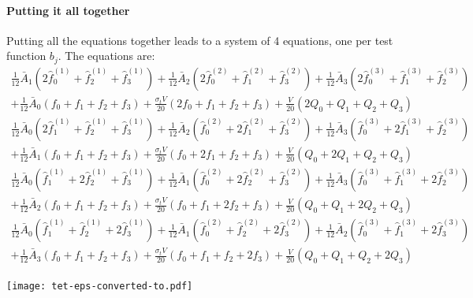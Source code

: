 \documentclass[12pt,letterpaper]{article}
\begin{document}
\paragraph{Putting it all together}
Putting all the equations together leads to a system of 4 equations, one per test function $b_j$.
The equations are:
\begin{align*}
\frac{1}{12} \bar{A}_1 \left( 2\hat{f}^{(1)}_0 + \hat{f}^{(1)}_2 + \hat{f}^{(1)}_3 \right)
+ \frac{1}{12} \bar{A}_2 \left( 2\hat{f}^{(2)}_0 + \hat{f}^{(2)}_1 + \hat{f}^{(2)}_3 \right)
+ \frac{1}{12} \bar{A}_3 \left( 2\hat{f}^{(3)}_0 + \hat{f}^{(3)}_1 + \hat{f}^{(3)}_2 \right) \\
+ \frac{1}{12} \bar{A}_0 \left( f_0 + f_1 + f_2 + f_3 \right)
+ \frac{\sigma_t V}{20} \left( 2f_0 + f_1 + f_2 + f_3 \right)
+ \frac{V}{20} \left( 2Q_0 + Q_1 + Q_2 + Q_3 \right)
\end{align*}
\begin{align*}
\frac{1}{12} \bar{A}_0 \left( 2\hat{f}^{(1)}_1 + \hat{f}^{(1)}_2 + \hat{f}^{(1)}_3 \right)
+ \frac{1}{12} \bar{A}_2 \left( \hat{f}^{(2)}_0 + 2\hat{f}^{(2)}_1 + \hat{f}^{(2)}_3 \right)
+ \frac{1}{12} \bar{A}_3 \left( \hat{f}^{(3)}_0 + 2\hat{f}^{(3)}_1 + \hat{f}^{(3)}_2 \right) \\
+ \frac{1}{12} \bar{A}_1 \left( f_0 + f_1 + f_2 + f_3 \right)
+ \frac{\sigma_t V}{20} \left( f_0 + 2f_1 + f_2 + f_3 \right)
+ \frac{V}{20} \left( Q_0 + 2Q_1 + Q_2 + Q_3 \right)
\end{align*}
\begin{align*}
\frac{1}{12} \bar{A}_0 \left( \hat{f}^{(1)}_1 + 2\hat{f}^{(1)}_2 + \hat{f}^{(1)}_3 \right)
+ \frac{1}{12} \bar{A}_1 \left( \hat{f}^{(2)}_0 + 2\hat{f}^{(2)}_2 + \hat{f}^{(2)}_3 \right)
+ \frac{1}{12} \bar{A}_3 \left( \hat{f}^{(3)}_0 + \hat{f}^{(3)}_1 + 2\hat{f}^{(3)}_2 \right) \\
+ \frac{1}{12} \bar{A}_2 \left( f_0 + f_1 + f_2 + f_3 \right)
+ \frac{\sigma_t V}{20} \left( f_0 + f_1 + 2f_2 + f_3 \right)
+ \frac{V}{20} \left( Q_0 + Q_1 + 2Q_2 + Q_3 \right)
\end{align*}
\begin{align*}
\frac{1}{12} \bar{A}_0 \left( \hat{f}^{(1)}_1 + \hat{f}^{(1)}_2 + 2\hat{f}^{(1)}_3 \right)
+ \frac{1}{12} \bar{A}_1 \left( \hat{f}^{(2)}_0 + \hat{f}^{(2)}_2 + 2\hat{f}^{(2)}_3 \right)
+ \frac{1}{12} \bar{A}_2 \left( \hat{f}^{(3)}_0 + \hat{f}^{(3)}_1 + 2\hat{f}^{(3)}_3 \right) \\
+ \frac{1}{12} \bar{A}_3 \left( f_0 + f_1 + f_2 + f_3 \right)
+ \frac{\sigma_t V}{20} \left( f_0 + f_1 + f_2 + 2f_3 \right)
+ \frac{V}{20} \left( Q_0 + Q_1 + Q_2 + 2Q_3 \right)
\end{align*}


\texttt{[image: tet-eps-converted-to.pdf]}
\end{document}
